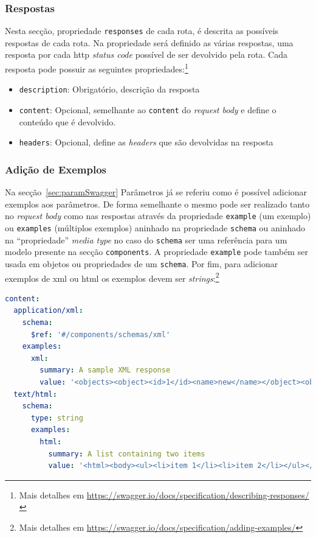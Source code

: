 \subsubsection{Respostas}
Nesta secção, propriedade \texttt{responses} de cada rota, é descrita as possíveis respostas de cada rota. Na propriedade será definido as várias respostas, uma resposta por cada \acrshort{http} \textit{status code} possível de ser devolvido pela rota. Cada resposta pode possuir as seguintes propriedades:\footnote{Mais detalhes em \url{https://swagger.io/docs/specification/describing-responses/}}
\begin{itemize}
    \item \texttt{description}: Obrigatório, descrição da resposta
    \item \texttt{content}: Opcional, semelhante ao \texttt{content} do \textit{request body} e define o conteúdo que é devolvido.
    \item \texttt{headers}: Opcional, define as \textit{headers} que são devolvidas na resposta
\end{itemize}

\subsubsection{Adição de Exemplos}
Na secção~\ref{sec:paramSwagger} Parâmetros já se referiu como é possível adicionar exemplos aos parâmetros. De forma semelhante o mesmo pode ser realizado tanto no \textit{request body} como nas respostas através da propriedade \texttt{example} (um exemplo) ou \texttt{examples} (múltiplos exemplos) aninhado na propriedade \texttt{schema} ou aninhado na ``propriedade'' \textit{media type} no caso do \texttt{schema} ser uma referência para um modelo presente na secção \texttt{components}. A propriedade \texttt{example} pode também ser usada em objetos ou propriedades de um \texttt{schema}. Por fim, para adicionar exemplos de \acrshort{xml} ou \acrshort{html} os exemplos devem ser \textit{strings}:\footnote{Mais detalhes em \url{https://swagger.io/docs/specification/adding-examples/}}
\begin{lstlisting}[language=yaml, caption=Exemplo de adição de exemplos para \acrshort{xml} e \acrshort{html} na especificação \textit{OpenAPI}]
content:
  application/xml:
    schema:
      $ref: '#/components/schemas/xml'
    examples:
      xml:
        summary: A sample XML response
        value: '<objects><object><id>1</id><name>new</name></object><object><id>2</id></object></objects>'
  text/html:
    schema:
      type: string
      examples:
        html:
          summary: A list containing two items
          value: '<html><body><ul><li>item 1</li><li>item 2</li></ul></body></html>'
\end{lstlisting}

